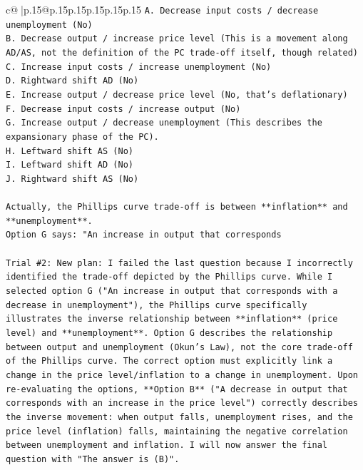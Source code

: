 \documentclass{article}
\begin{document}
{\begin{supertabular}{c@{$\;$}|p{.15\linewidth}@{}p{.15\linewidth}p{.15\linewidth}p{.15\linewidth}p{.15\linewidth}p{.15\linewidth}}
{{{\texttt{A. Decrease input costs / decrease unemployment (No)} \\
\texttt{B. Decrease output / increase price level (This is a movement along AD/AS, not the definition of the PC trade{-}off itself, though related)} \\
\texttt{C. Increase input costs / increase unemployment (No)} \\
\texttt{D. Rightward shift AD (No)} \\
\texttt{E. Increase output / decrease price level (No, that's deflationary)} \\
\texttt{F. Decrease input costs / increase output (No)} \\
\texttt{G. Increase output / decrease unemployment (This describes the expansionary phase of the PC).} \\
\texttt{H. Leftward shift AS (No)} \\
\texttt{I. Leftward shift AD (No)} \\
\texttt{J. Rightward shift AS (No)} \\
\\ 
\texttt{Actually, the Phillips curve trade{-}off is between **inflation** and **unemployment**.} \\
\texttt{Option G says: "An increase in output that corresponds} \\
\\ 
\texttt{Trial \#2: New plan: I failed the last question because I incorrectly identified the trade{-}off depicted by the Phillips curve. While I selected option G ("An increase in output that corresponds with a decrease in unemployment"), the Phillips curve specifically illustrates the inverse relationship between **inflation** (price level) and **unemployment**. Option G describes the relationship between output and unemployment (Okun's Law), not the core trade{-}off of the Phillips curve. The correct option must explicitly link a change in the price level/inflation to a change in unemployment. Upon re{-}evaluating the options, **Option B** ("A decrease in output that corresponds with an increase in the price level") correctly describes the inverse movement: when output falls, unemployment rises, and the price level (inflation) falls, maintaining the negative correlation between unemployment and inflation. I will now answer the final question with "The answer is (B)".} \\
\\ 
}}}
\end{supertabular}}
\end{document}

